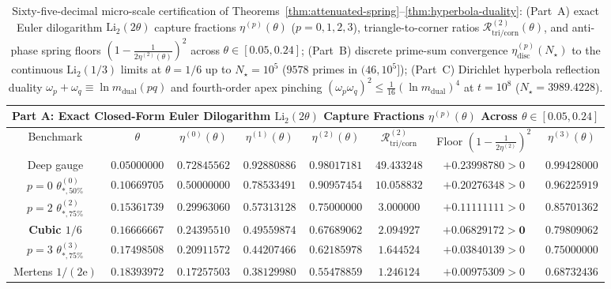 \documentclass[11pt,reqno]{amsart}
\theoremstyle{definition}
\theoremstyle{remark}
\numberwithin{equation}{section}
\newcommand{\ee}{\mathrm{e}}
\newcommand{\Li}{\mathrm{Li}}
\newcommand{\tri}{\mathrm{tri}}
\newcommand{\corn}{\mathrm{corn}}
\newcommand{\dual}{\mathrm{dual}}
\begin{document}
\begin{table}[htbp]
\centering
\caption{Sixty-five-decimal micro-scale certification of Theorems~\ref{thm:attenuated-spring}--\ref{thm:hyperbola-duality}: (Part~A) exact Euler dilogarithm $\Li_2(2\theta)$ capture fractions $\eta^{(p)}(\theta)$ ($p=0,1,2,3$), triangle-to-corner ratios $\mathcal{R}_{\tri/\corn}^{(2)}(\theta)$, and anti-phase spring floors $(1 - \frac{1}{2\eta^{(2)}(\theta)})^2$ across $\theta \in [0.05, 0.24]$; (Part~B) discrete prime-sum convergence $\eta_{\mathrm{disc}}^{(p)}(N_\star)$ to the continuous $\Li_2(1/3)$ limits at $\theta=1/6$ up to $N_\star = 10^5$ ($9578$ primes in $(46,10^5]$); (Part~C) Dirichlet hyperbola reflection duality $\omega_p+\omega_q \equiv \ln m_{\dual}(pq)$ and fourth-order apex pinching $(\omega_p\omega_q)^2 \le \frac{1}{16}(\ln m_{\dual})^4$ at $t = 10^8$ ($N_\star = 3989.4228$).}
\label{tab:micro-certification}
\tiny
\setlength{\tabcolsep}{1.2pt}
\renewcommand{\arraystretch}{1.15}
\begin{tabular}{@{}cccccccc@{}}
\toprule
\multicolumn{8}{c}{\textbf{Part A: Exact Closed-Form Euler Dilogarithm $\mathrm{Li}_2(2\theta)$ Capture Fractions $\eta^{(p)}(\theta)$ Across $\theta \in [0.05, 0.24]$}} \\
\midrule
Benchmark & $\theta$ & $\eta^{(0)}(\theta)$ & $\eta^{(1)}(\theta)$ & $\eta^{(2)}(\theta)$ & $\mathcal{R}_{\tri/\corn}^{(2)}$ & Floor $(1-\frac{1}{2\eta^{(2)}})^2$ & $\eta^{(3)}(\theta)$ \\
\midrule
Deep gauge & $0.05000000$ & $0.72845562$ & $0.92880886$ & $0.98017181$ & $49.433248$ & $+0.23998780 > 0$ & $0.99428000$ \\
$p=0$ $\theta_{*,50\%}^{(0)}$ & $0.10669705$ & $\mathbf{0.50000000}$ & $0.78533491$ & $0.90957454$ & $10.058832$ & $+0.20276348 > 0$ & $0.96225919$ \\
$p=2$ $\theta_{*,75\%}^{(2)}$ & $0.15361739$ & $0.29963060$ & $0.57313128$ & $\mathbf{0.75000000}$ & $3.000000$ & $+0.11111111 > 0$ & $0.85701362$ \\
\textbf{Cubic $1/6$} & $\mathbf{0.16666667}$ & $\mathbf{0.24395510}$ & $\mathbf{0.49559874}$ & $\mathbf{0.67689062}$ & $\mathbf{2.094927}$ & $\mathbf{+0.06829172 > 0}$ & $\mathbf{0.79809062}$ \\
$p=3$ $\theta_{*,75\%}^{(3)}$ & $0.17498508$ & $0.20911572$ & $0.44207466$ & $0.62185978$ & $1.644524$ & $+0.03840139 > 0$ & $\mathbf{0.75000000}$ \\
Mertens $1/(2\ee)$ & $0.18393972$ & $0.17257503$ & $0.38129980$ & $0.55478859$ & $1.246124$ & $+0.00975309 > 0$ & $0.68732436$ \\

\end{tabular}
\end{table}
\end{document}
